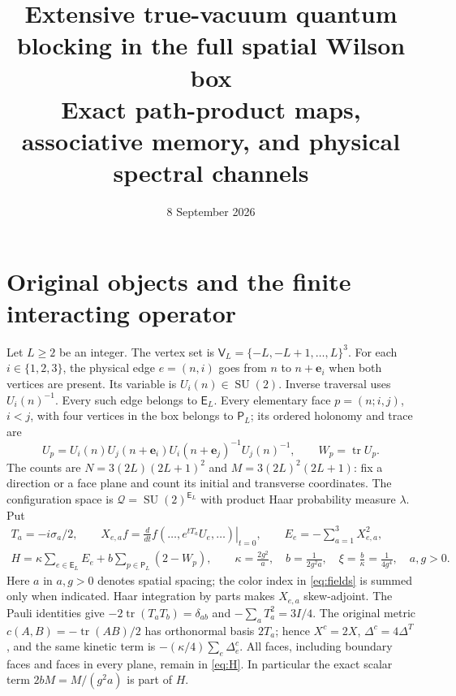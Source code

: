 \documentclass[11pt]{article}
\title{Extensive true-vacuum quantum blocking in the full spatial Wilson box\\
Exact path-product maps, associative memory, and physical spectral channels}
\author{}
\date{8 September 2026}
\newcommand{\SU}{\operatorname{SU}}
\newcommand{\tr}{\operatorname{tr}}
\newcommand{\EE}{\mathsf E}
\newcommand{\PP}{\mathsf P}
\begin{document}
\maketitle

\section{Original objects and the finite interacting operator}

Let $L\geq2$ be an integer. The vertex set is
$\mathsf V_L=\{-L,-L+1,\ldots,L\}^3$. For each $i\in\{1,2,3\}$,
the physical edge $e=(n,i)$ goes from $n$ to $n+\mathbf e_i$ when both
vertices are present. Its variable is $U_i(n)\in\SU(2)$. Inverse traversal
uses $U_i(n)^{-1}$. Every such edge belongs to $\EE_L$. Every elementary
face $p=(n;i,j)$, $i<j$, with four vertices in the box belongs to $\PP_L$;
its ordered holonomy and trace are
\begin{equation}\label{eq:plaquette}
 U_p=U_i(n)U_j(n+\mathbf e_i)U_i(n+\mathbf e_j)^{-1}U_j(n)^{-1},
 \qquad W_p=\tr U_p.
\end{equation}
The counts are $N=3(2L)(2L+1)^2$ and $M=3(2L)^2(2L+1)$: fix a
direction or a face plane and count its initial and transverse coordinates.
The configuration space is $\mathcal Q=\SU(2)^{\EE_L}$ with product
Haar probability measure $\lambda$. Put
\begin{gather}
 T_a=-i\sigma_a/2,\qquad
 X_{e,a}f=\left.\frac{d}{dt}f(\ldots,e^{tT_a}U_e,\ldots)\right|_{t=0},
 \qquad E_e=-\sum_{a=1}^3X_{e,a}^2,\label{eq:fields}\\
 H=\kappa\sum_{e\in\EE_L}E_e+b\sum_{p\in\PP_L}(2-W_p),\qquad
 \kappa=\frac{2g^2}{a},\quad b=\frac{1}{2g^2a},\quad
 \xi=\frac b\kappa=\frac1{4g^4},\quad a,g>0.\label{eq:H}
\end{gather}
Here $a$ in $a,g>0$ denotes spatial spacing; the color index in
\eqref{eq:fields} is summed only when indicated. Haar integration by parts
makes $X_{e,a}$ skew-adjoint. The Pauli identities give
$-2\tr(T_aT_b)=\delta_{ab}$ and $-\sum_aT_a^2=3I/4$.
The original metric $c(A,B)=-\tr(AB)/2$ has orthonormal basis $2T_a$;
hence $X^c=2X$, $\Delta^c=4\Delta^T$, and the same kinetic term is
$-(\kappa/4)\sum_e\Delta_e^c$. All faces, including boundary faces
and faces in every plane, remain in \eqref{eq:H}.
In particular the exact scalar term $2bM=M/(g^2a)$ is part of $H$.
\end{document}
